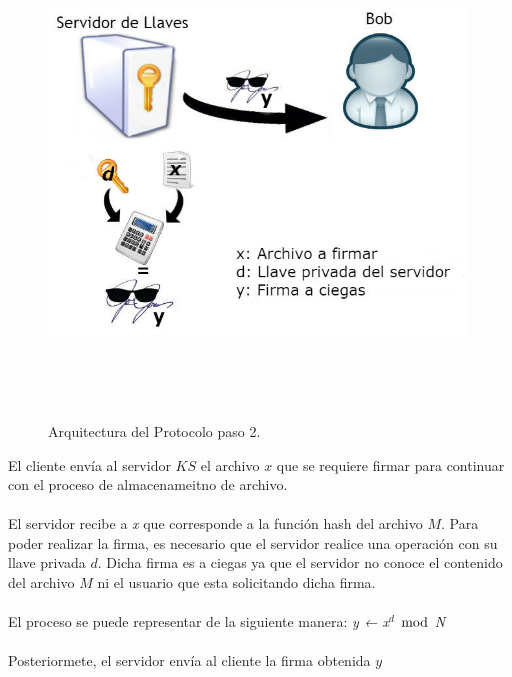 \begin{figure}[H]
\centering
\includegraphics[width=16cm, height=13cm]{./images/Paso02.jpg}
\caption{Arquitectura del Protocolo paso 2.}

\end{figure}

El cliente envía al servidor $KS$ el archivo $x$ que se requiere firmar para continuar con el proceso de almacenameitno de archivo.\\ \\
El servidor recibe a \textit{x} que corresponde a la función hash del archivo $M$. Para poder realizar la firma, es necesario que el servidor realice una operación con su llave privada $d$. Dicha firma es a ciegas ya que el servidor no conoce el contenido del archivo $M$ ni el usuario que esta solicitando dicha firma. \\ \\
El proceso se puede representar de la siguiente manera: \hspace{2cm} \textit{y ← x$^d$ $\bmod$ N} \\ \\
Posteriormete, el servidor envía al cliente la firma obtenida $y$




